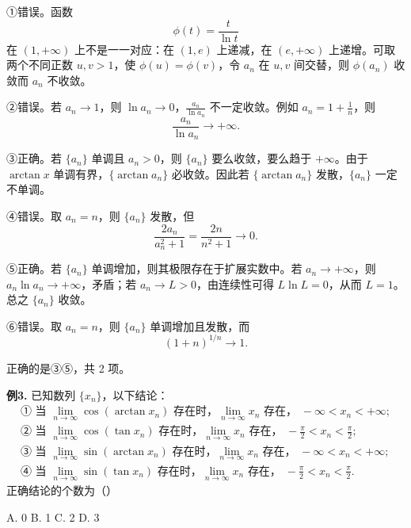 \begin{solutionblock}

①错误。函数
\[
\phi(t)=\frac{t}{\ln t}
\]
在 \((1,+\infty)\) 上不是一一对应：在 \((1,e)\) 上递减，在 \((e,+\infty)\) 上递增。可取两个不同正数 \(u,v>1\)，使 \(\phi(u)=\phi(v)\)，令 \(a_n\) 在 \(u,v\) 间交替，则 \(\phi(a_n)\) 收敛而 \(a_n\) 不收敛。

②错误。若 \(a_n\to1\)，则 \(\ln a_n\to0\)，\(\frac{a_n}{\ln a_n}\) 不一定收敛。例如 \(a_n=1+\frac1n\)，则
\[
\frac{a_n}{\ln a_n}\to+\infty.
\]

③正确。若 \(\{a_n\}\) 单调且 \(a_n>0\)，则 \(\{a_n\}\) 要么收敛，要么趋于 \(+\infty\)。由于 \(\arctan x\) 单调有界，\(\{\arctan a_n\}\) 必收敛。因此若 \(\{\arctan a_n\}\) 发散，\(\{a_n\}\) 一定不单调。

④错误。取 \(a_n=n\)，则 \(\{a_n\}\) 发散，但
\[
\frac{2a_n}{a_n^2+1}=\frac{2n}{n^2+1}\to0.
\]

⑤正确。若 \(\{a_n\}\) 单调增加，则其极限存在于扩展实数中。若 \(a_n\to+\infty\)，则 \(a_n\ln a_n\to+\infty\)，矛盾；若 \(a_n\to L>0\)，由连续性可得 \(L\ln L=0\)，从而 \(L=1\)。总之 \(\{a_n\}\) 收敛。

⑥错误。取 \(a_n=n\)，则 \(\{a_n\}\) 单调增加且发散，而
\[
(1+n)^{1/n}\to1.
\]

正确的是③⑤，共 2 项。

\end{solutionblock}

\begin{problemblock}
\textbf{例3.} 已知数列 \(\{x_n\}\)，以下结论：
\[
\begin{array}{ll}
\text{① 当 }\lim\limits_{n\to\infty}\cos(\arctan x_n)\text{ 存在时，}\lim\limits_{n\to\infty}x_n\text{ 存在， }-\infty<x_n<+\infty;\\
\text{② 当 }\lim\limits_{n\to\infty}\cos(\tan x_n)\text{ 存在时，}\lim\limits_{n\to\infty}x_n\text{ 存在， }-\frac\pi2<x_n<\frac\pi2;\\
\text{③ 当 }\lim\limits_{n\to\infty}\sin(\arctan x_n)\text{ 存在时，}\lim\limits_{n\to\infty}x_n\text{ 存在， }-\infty<x_n<+\infty;\\
\text{④ 当 }\lim\limits_{n\to\infty}\sin(\tan x_n)\text{ 存在时，}\lim\limits_{n\to\infty}x_n\text{ 存在， }-\frac\pi2<x_n<\frac\pi2.
\end{array}
\]
正确结论的个数为（\quad）

A. 0 \qquad B. 1 \qquad C. 2 \qquad D. 3
\end{problemblock}

